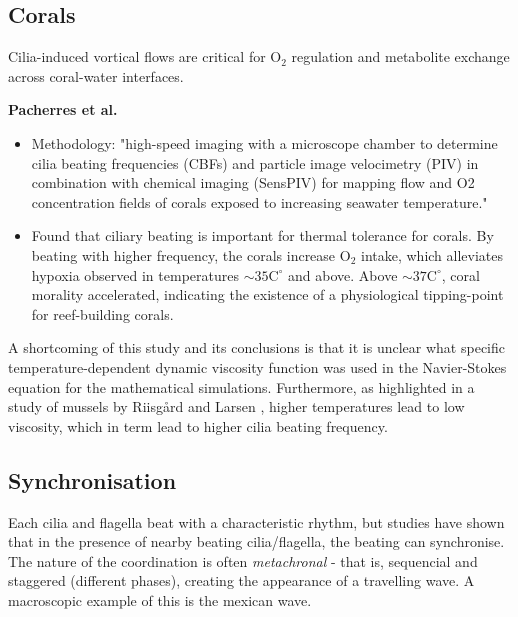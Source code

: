 \documentclass{article}
\theoremstyle{definition}
\numberwithin{equation}{subsection}
\newcommand{\nl}{\par\noindent}
\begin{document}
\subsection{Corals}
Cilia-induced vortical flows are critical for $\text{O}_2$ regulation and metabolite exchange across coral-water interfaces. \nl
\textbf{Pacherres et al.} \cite{pacherresAcuteTemperatureEffects}
\begin{itemize}
        \item Methodology: "high-speed imaging with a microscope chamber to determine cilia beating frequencies (CBFs) and particle image velocimetry (PIV) in combination with chemical imaging (SensPIV) for mapping flow and O2 concentration fields of corals exposed to increasing seawater temperature."
        
        \item Found that ciliary beating is important for thermal tolerance for corals. By beating with higher frequency, the corals increase $\text{O}_2$ intake, which alleviates hypoxia observed in temperatures $\sim 35 \text{C}^{\circ}$ and above. Above $\sim 37 \text{C}^{\circ}$, coral morality accelerated, indicating the existence of a physiological tipping-point for reef-building corals.
\end{itemize}
\nl
A shortcoming of this study and its conclusions is that it is unclear what specific temperature-dependent dynamic viscosity function was used in the Navier-Stokes equation for the mathematical simulations. Furthermore, as highlighted in a study of mussels by Riisgård and Larsen \cite{riisgardViscositySeawaterControls2007}, higher temperatures lead to low viscosity, which in term lead to higher cilia beating frequency. 

\subsection{Synchronisation}
Each cilia and flagella beat with a characteristic rhythm, but studies have shown that in the presence of nearby beating cilia/flagella, the beating can synchronise.\cite{brumleyFlagellarSynchronizationDirect2014} The nature of the coordination is often \textit{metachronal} - that is, sequencial and staggered (different phases), creating the appearance of a travelling wave. A macroscopic example of this is the mexican wave.
\cite{brumleyMetachronalWavesFlagellar2015}

\medskip

\printglossary

\printbibliography
\end{document}
